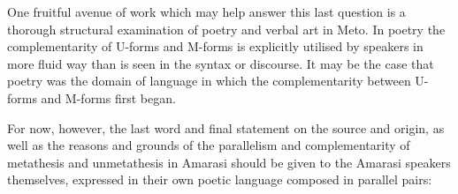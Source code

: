 One fruitful avenue of work which may help answer this last
question is a thorough structural examination of poetry and
verbal art in Meto. In poetry the complementarity of U-forms
and M-forms is explicitly utilised by speakers in more fluid
way than is seen in the syntax or discourse.
It may be the case that poetry was the domain of
language in which the complementarity between U-forms and M-forms first began.

For now, however, the last word and final statement on the
source and origin, as well as the reasons and grounds
of the parallelism and complementarity of metathesis and unmetathesis
in Amarasi should be given to the Amarasi speakers themselves,
expressed in their own poetic language composed in parallel pairs:

\begin{exe}
	\vspace{4pt}\label{ex:24/05/2009}
	\begin{xlist}
		\vspace{4pt}
		\vspace{4pt}
		\vspace{4pt}
	\end{xlist}
\end{exe}
